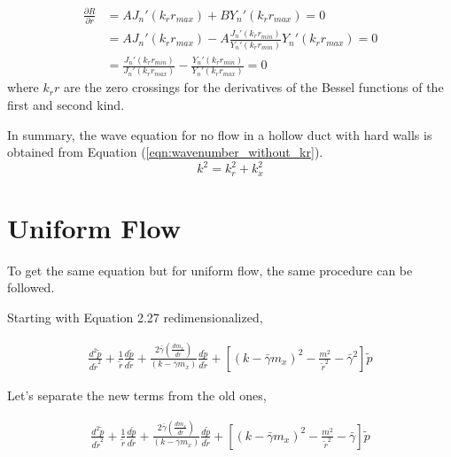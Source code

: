 \begin{align*} 
    \frac{ \partial R}{\partial r} &= AJ_n'(k_r r_{max}) + B Y_n' (k_r r_{max}) = 0 \\
                                   &= AJ_n'(k_r r_{max}) - A\frac{J_n' (k_r r_{min})}{Y_n'(k_r r_{min})} Y_n' (k_r r_{max}) = 0 \\
                                   &= \frac{J_n'(k_r r_{min})}{J_n' (k_r r_{max})} - \frac{Y_n'(k_r r_{min})}{Y_n' (k_r r_{max})} = 0 
\end{align*}
where $k_r r$ are the zero crossings for the derivatives of the Bessel functions of the first and second kind.

In summary, the wave equation for no flow in a hollow duct with hard walls is obtained 
from Equation (\ref{eqn:wavenumber_without_kr}).
\begin{equation}
    k^2 = k_r^2 + k_x^2
    \label{eqn:wavenumber_equation}
\end{equation}


\section{Uniform Flow}

To get the same equation but for uniform flow, the same procedure can be followed.

Starting with Equation 2.27 redimensionalized, 

\begin{align*}
    \frac{ d^2 \tilde{p}}{d \tilde{r}^2} +
    \frac{1}{\tilde{r}} 
    \frac{d \tilde{p}}{d \tilde{r}} + 
    \frac{2 \bar{\gamma} \left( \frac{d m_x}{d \tilde{r}} \right)}
    {\left( k - \bar{\gamma} m_x \right)}\frac{d \tilde{p}}{d \tilde{r}}+
    \left[ \left( k - \bar{\gamma} m_x \right)^2 - \frac{m^2}{\tilde{r}^2}- 
    \bar{\gamma}^2 \right] \tilde{p}
\end{align*}

Let's separate the new terms from the old ones, 

\begin{align*}
    \frac{ d^2 \tilde{p}}{d \tilde{r}^2} +
    \frac{1}{\tilde{r}} 
    \frac{d \tilde{p}}{d \tilde{r}} + 
    \frac{2 \bar{\gamma} \left( \frac{d m_x}{d \tilde{r}} \right)}
    {\left( k - \bar{\gamma} m_x \right)}\frac{d \tilde{p}}{d \tilde{r}}+
    \left[ \left( k - \bar{\gamma} m_x \right)^2 - \frac{m^2}{\tilde{r}^2}- 
    \bar{\gamma} \right] \tilde{p}
\end{align*}


